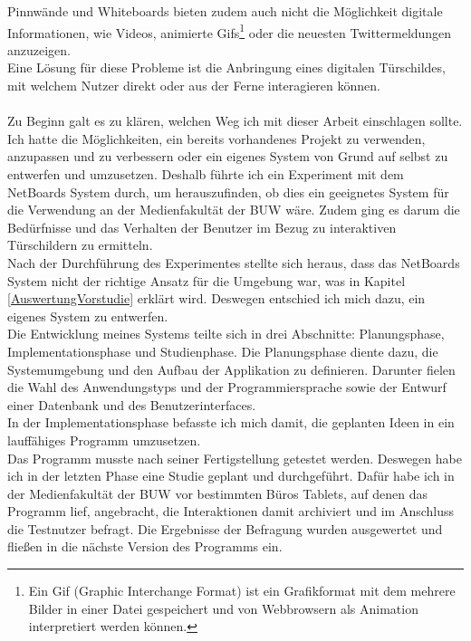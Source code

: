 Pinnwände und Whiteboards bieten zudem auch nicht die Möglichkeit digitale Informationen, wie Videos, animierte Gifs\footnote{Ein Gif (Graphic Interchange Format) ist ein Grafikformat mit dem mehrere Bilder in einer Datei gespeichert und von Webbrowsern als Animation interpretiert werden können.} oder die neuesten Twittermeldungen anzuzeigen.
\\
Eine Lösung für diese Probleme ist die Anbringung eines digitalen Türschildes, mit welchem Nutzer direkt oder aus der Ferne interagieren können.
\\
\\
Zu Beginn galt es zu klären, welchen Weg ich mit dieser Arbeit einschlagen sollte.
Ich hatte die Möglichkeiten, ein bereits vorhandenes Projekt zu verwenden, anzupassen und zu verbessern oder ein eigenes System von Grund auf selbst zu entwerfen und umzusetzen.
Deshalb führte ich ein Experiment mit dem NetBoards System \cite{wood:2014,netboards:website} durch, um herauszufinden, ob dies ein geeignetes System für die Verwendung an der Medienfakultät der BUW wäre. Zudem ging es darum die Bedürfnisse und das Verhalten der Benutzer im Bezug zu interaktiven Türschildern zu ermitteln.
\\
Nach der Durchführung des Experimentes stellte sich heraus, dass das NetBoards System nicht der richtige Ansatz für die Umgebung war, was in Kapitel \ref{AuswertungVorstudie} erklärt wird. Deswegen entschied ich mich dazu, ein eigenes System zu entwerfen.
\\
Die Entwicklung meines Systems teilte sich in drei Abschnitte: Planungsphase, Implementationsphase und Studienphase.
Die Planungsphase diente dazu, die Systemumgebung und den Aufbau der Applikation zu definieren.
Darunter fielen die Wahl des Anwendungstyps und der Programmiersprache sowie der Entwurf einer Datenbank und des Benutzerinterfaces.
\\
In der Implementationsphase befasste ich mich damit, die geplanten Ideen in ein lauffähiges Programm umzusetzen.
\\
Das Programm musste nach seiner Fertigstellung getestet werden. Deswegen habe ich in der letzten Phase eine Studie geplant und durchgeführt. Dafür habe ich in der Medienfakultät der BUW vor bestimmten Büros Tablets, auf denen das Programm lief, angebracht, die Interaktionen damit archiviert und im Anschluss die Testnutzer befragt. Die Ergebnisse der Befragung wurden ausgewertet und fließen in die nächste Version des Programms ein.
